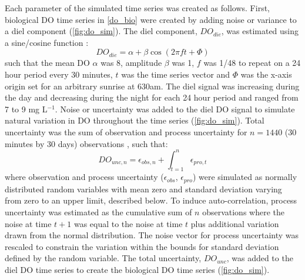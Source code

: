\documentclass[letterpaper,12pt,oneside]{article}\usepackage[]{graphicx}\usepackage[]{color}
\begin{document}
Each parameter of the simulated time series was created as follows. First, biological \ac{DO} time series in \cref{do_bio} were created by adding noise or variance to a diel component (\cref{fig:do_sim}).  The diel component, $DO_{die}$, was estimated using a sine/cosine function \citep{Cryer08}:
\begin{equation} \label{do_sin}
DO_{die} = \alpha + \beta\cos\left(2\pi ft + \Phi\right)
\end{equation}
such that the mean DO $\alpha$ was 8, amplitude $\beta$ was 1, $f$ was 1/48 to repeat on a 24 hour period every 30 minutes, $t$ was the time series vector and $\Phi$ was the x-axis origin set for an arbitrary sunrise at 630am.  The diel signal was increasing during the day and decreasing during the night for each 24 hour period and ranged from 7 to 9 mg L$^{-1}$.  Noise or uncertainty was added to the diel \ac{DO} signal to simulate natural variation in \ac{DO} throughout the time series (\cref{fig:do_sim}).  Total uncertainty was the sum of observation and process uncertainty for $n = 1440$ (30 minutes by 30 days) observations \citep{Hilborn97}, such that:
\begin{equation} \label{do_unc_n}
DO_{unc, n} = \epsilon_{obs, n} + \int_{t = 1}^{n} \epsilon_{pro, t}
\end{equation}
where observation and process uncertainty ($\epsilon_{obs}$, $\epsilon_{pro}$) were simulated as normally distributed random variables with mean zero and standard deviation varying from zero to an upper limit, described below.  To induce auto-correlation, process uncertainty was estimated as the cumulative sum of $n$ observations where the noise at time $t+1$ was equal to the noise at time $t$ plus additional variation drawn from the normal distribution.  The noise vector for process uncertainty was rescaled to constrain the variation within the bounds for standard deviation defined by the random variable. The total uncertainty, $DO_{unc}$, was added to the diel \ac{DO} time series to create the biological \ac{DO} time series (\cref{fig:do_sim}).
\end{document}
